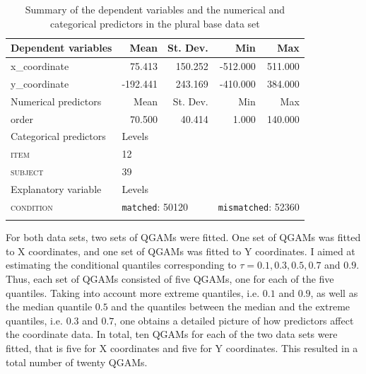 \begin{table}\fontsize{10}{11}
\caption{Summary of the dependent variables and the numerical and categorical predictors in the plural base data set}
\label{tab:7.10}
\centering
\begin{tabular}{lrrrr} 
\lsptoprule
Dependent variables    & Mean     & St. Dev.                  & Min      & Max                           \\ 
\midrule
x\_coordinate          & 75.413   & 150.252                   & -512.000 & 511.000                       \\
y\_coordinate          & -192.441 & 243.169                   & -410.000 & 384.000                       \\ 
\midrule
Numerical predictors   & Mean     & St. Dev.                  & Min      & Max                           \\ 
\midrule
order                  & 70.500   & 40.414                    & 1.000    & 140.000                       \\ 
\midrule
Categorical predictors & \multicolumn{1}{l}{Levels}   & ~                         & ~        & ~                             \\ 
\midrule
\textsc{item}                   & \multicolumn{1}{l}{12}       & ~                         & ~        & ~                             \\
\textsc{subject}                & \multicolumn{1}{l}{39}       & ~                         & ~        & ~                             \\ 
\midrule
Explanatory variable   & \multicolumn{1}{l}{Levels}   & ~                         & ~        & ~                             \\ 
\midrule
\textsc{condition}              & \multicolumn{2}{l}{\texttt{matched}:
  50120} & \multicolumn{2}{l}{\texttt{mismatched}:
  52360}  \\
\lspbottomrule
\end{tabular}
\end{table}

For both data sets, two sets of QGAMs were fitted. One set of QGAMs was fitted to X coordinates, and one set of QGAMs was fitted to Y coordinates. I aimed at estimating the conditional quantiles corresponding to $\tau=0.1,0.3,0.5,0.7$ and $0.9$. Thus, each set of QGAMs consisted of five QGAMs, one for each of the five quantiles. Taking into account more extreme quantiles, i.e. $0.1$ and $0.9$, as well as the median quantile $0.5$ and the quantiles between the median and the extreme quantiles, i.e. $0.3$ and $0.7$, one obtains a detailed picture of how predictors affect the coordinate data. In total, ten QGAMs for each of the two data sets were fitted, that is five for X coordinates and five for Y coordinates. This resulted in a total number of twenty QGAMs.

